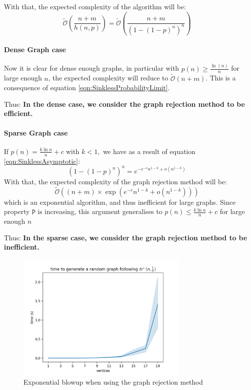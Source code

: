 With that, the expected complexity of the algorithm will be:
$$
\tilde{\mathcal{O}}\left(\frac{n+m}{h(n,p)}\right)=\tilde{\mathcal{O}}\left(\frac{n+m}{(1-(1-p)^n)^n}\right)
$$

\paragraph{Dense Graph case}
Now it is clear for dense enough graphs, in particular with $p(n) \ge \frac{\ln (n)}{n}$ for large enough $n$, the expected complexity will reduce to $\tilde{\mathcal{O}}(n+m)$. This is a consequence of equation \eqref{eqn:SinklessProbabilityLimit}.

Thus: \textbf{In the dense case, we consider the graph rejection method to be efficient.}

\paragraph{Sparse Graph case}
If $p(n)=\frac{k\ln n}{n}+c$ with $k<1,$ we have as a result of equation \eqref{eqn:SinklessAsymptotic}:
$$
(1-(1-p)^n)^n=e^{-e^{-c}n^{1-k}+o(n^{1-k})}
$$
With that, the expected complexity of the graph rejection method will be:
$$
\tilde{\mathcal{O}}\left((n+m)\times \exp\left(e^{-c}n^{1-k}+o(n^{1-k})\right)\right)
$$
which is an exponential algorithm, and thus inefficient for large graphs.
Since property $\mathtt{P}$ is increasing, this argument generalises to $p(n) \le \frac{k\ln n}{n}+c$ for large enough $n$

Thus: \textbf{In the sparse case, we consider the graph rejection method to be \newline inefficient.}
\begin{figure}[H]
	\centering
	\includegraphics[width=0.75\textwidth]{Figures/BadSparseGraphGen.png}
	\caption{Exponential blowup when using the graph rejection method}
\end{figure}
\FloatBarrier
